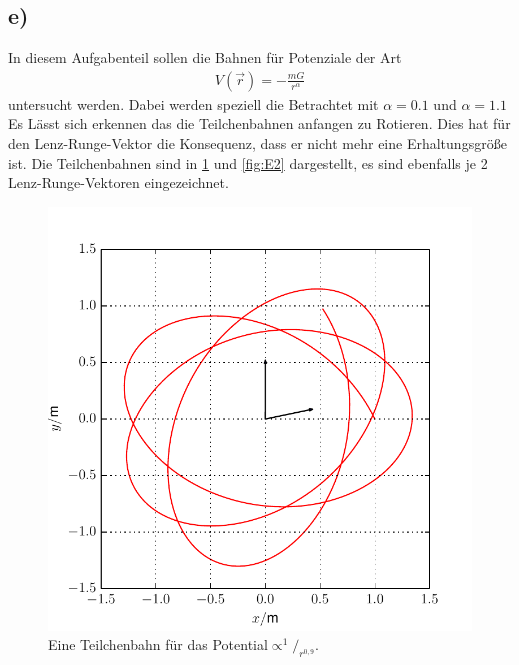 \subsection*{e)}
In diesem Aufgabenteil sollen die Bahnen für Potenziale der Art
\begin{align}
	V(\vec{r})=-\frac{mG}{r^\alpha}
\end{align}
untersucht werden. 
Dabei werden speziell die Betrachtet mit $\alpha=0.1$ und $\alpha=1.1$
Es Lässt sich erkennen das die Teilchenbahnen anfangen zu Rotieren.
Dies hat für den Lenz-Runge-Vektor die Konsequenz, dass er nicht mehr eine Erhaltungsgröße ist.
Die Teilchenbahnen sind in \cref{fig:E1} und \cref{fig:E2} dargestellt, es sind ebenfalls je 2 Lenz-Runge-Vektoren eingezeichnet.

\begin{figure}[H]
	\centering
	\includegraphics[width = \textwidth]{../Plots/Plot_4_E_1.pdf}
	\caption{Eine Teilchenbahn für das Potential$\propto^1\!/_{r^{0,9}}$.\label{fig:E1}}
\end{figure}

